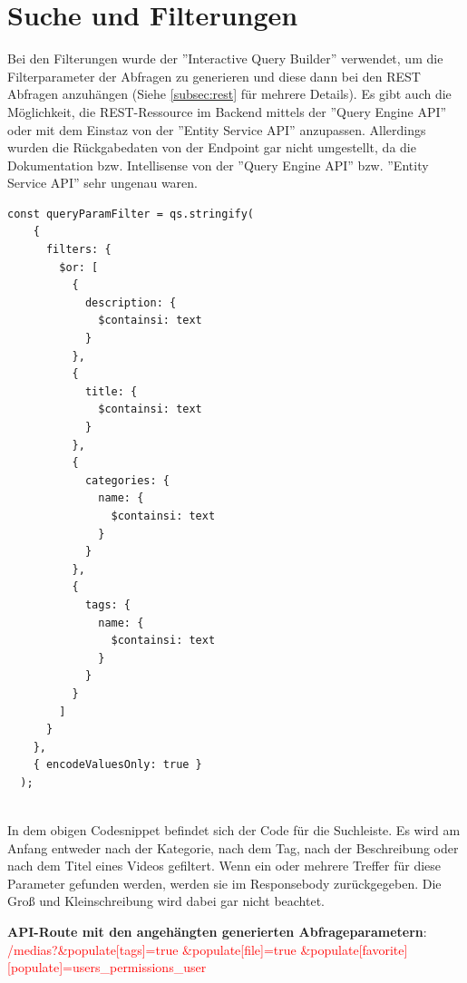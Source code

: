 \section{Suche und Filterungen}

Bei den Filterungen wurde der ''Interactive Query Builder'' verwendet,
um die Filterparameter der Abfragen zu generieren
und diese dann bei den REST Abfragen anzuhängen (Siehe \ref{subsec:rest} für mehrere Details).
Es gibt auch die Möglichkeit, die REST-Ressource im Backend mittels der
''Query Engine API'' oder mit dem Einstaz von der ''Entity Service API'' anzupassen.
Allerdings wurden die Rückgabedaten von der Endpoint gar nicht umgestellt,
da die Dokumentation bzw. Intellisense von der ''Query Engine API'' bzw. ''Entity Service API'' sehr ungenau waren.


\begin{lstlisting}[caption=Code von Interactive Query Builder]
  const queryParamFilter = qs.stringify(
    {
      filters: {
        $or: [
          {
            description: {
              $containsi: text
            }
          },
          {
            title: {
              $containsi: text
            }
          },
          {
            categories: {
              name: {
                $containsi: text
              }
            }
          },
          {
            tags: {
              name: {
                $containsi: text
              }
            }
          }
        ]
      }
    },
    { encodeValuesOnly: true }
  );
  
\end{lstlisting}
In dem obigen Codesnippet befindet sich der Code für die Suchleiste.
Es wird am Anfang entweder nach der Kategorie, nach dem Tag,
nach der Beschreibung oder nach dem Titel eines Videos gefiltert.
Wenn ein oder mehrere Treffer für diese Parameter gefunden werden,
werden sie im Responsebody zurückgegeben.
Die Groß und Kleinschreibung wird dabei gar nicht beachtet.


\begin{spacing}{1}
  \textbf{API-Route mit den angehängten generierten Abfrageparametern}:
  \newline
  \textcolor{red}{/medias?\&populate[tags]=true
  \&populate[file]=true
  \&populate[favorite][populate]=\newline users\_permissions\_user}
\end{spacing}

